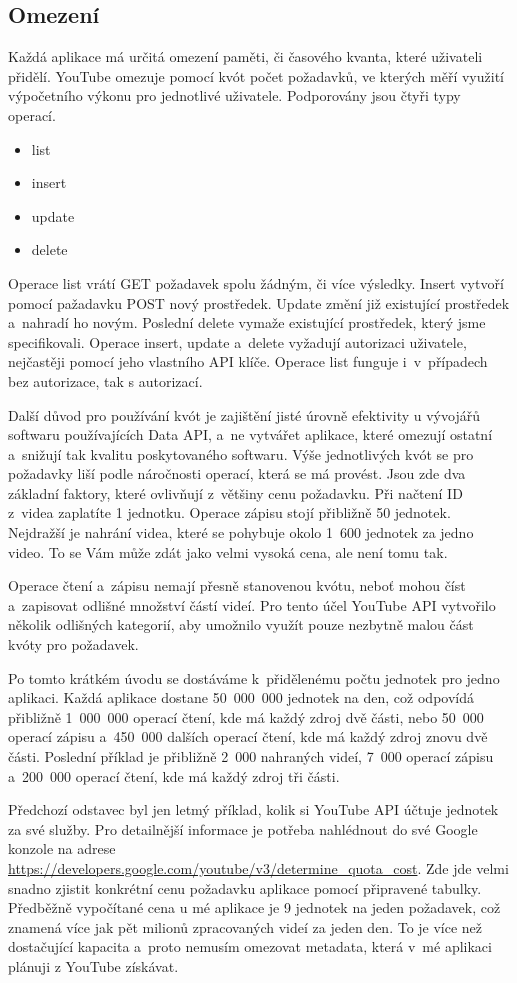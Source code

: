 \subsection{Omezení}
\par Každá aplikace má určitá omezení paměti\cite{quota}\cite{googleconsole}, či časového kvanta, které uživateli přidělí. YouTube omezuje pomocí kvót počet požadavků, ve kterých měří využití výpočetního výkonu pro jednotlivé uživatele. Podporovány jsou čtyři typy operací.
\begin{itemize}
\item {list}
\item {insert}
\item {update}
\item {delete}
\end{itemize}
\par Operace list vrátí GET požadavek spolu žádným, či více výsledky. Insert vytvoří pomocí pažadavku POST nový prostředek. Update změní již existující prostředek a~nahradí ho novým. Poslední delete vymaže existující prostředek, který jsme specifikovali. Operace insert, update a~delete vyžadují autorizaci uživatele, nejčastěji pomocí jeho vlastního API\cite{apistart} klíče. Operace list funguje i~v~případech bez autorizace, tak s autorizací.
\par Další důvod pro používání kvót je zajištění jisté úrovně efektivity u vývojářů softwaru používajících Data API, a~ne vytvářet aplikace, které omezují ostatní a~snižují tak kvalitu poskytovaného softwaru. Výše jednotlivých kvót se pro požadavky liší podle náročnosti operací, která se má provést. Jsou zde dva základní faktory, které ovlivňují z~většiny cenu požadavku. Při načtení ID z~videa zaplatíte 1 jednotku. Operace zápisu stojí přibližně 50 jednotek. Nejdražší je nahrání videa, které se pohybuje okolo 1~600 jednotek za jedno video. To se Vám může zdát jako velmi vysoká cena, ale není tomu tak. 
\par Operace čtení a~zápisu nemají přesně stanovenou kvótu, neboť mohou číst a~zapisovat odlišné množství částí videí. Pro tento účel YouTube API vytvořilo několik odlišných kategorií, aby umožnilo využít pouze nezbytně malou část kvóty pro požadavek. 
\par Po tomto krátkém úvodu se dostáváme k~přidělenému počtu jednotek pro jedno aplikaci. Každá aplikace dostane 50~000~000 jednotek na den, což odpovídá přibližně 1~000~000 operací čtení, kde má každý zdroj dvě části, nebo 50~000 operací zápisu a~450~000 dalších operací čtení, kde má každý zdroj znovu dvě části. Poslední příklad je přibližně 2~000 nahraných videí, 7~000 operací zápisu a~200~000 operací čtení, kde má každý zdroj tři části.
\par Předchozí odstavec byl jen letmý příklad, kolik si YouTube API účtuje jednotek za své služby. Pro detailnější informace je potřeba nahlédnout do své Google konzole na adrese \url{https://developers.google.com/youtube/v3/determine_quota_cost}\cite{quota}. Zde jde velmi snadno zjistit konkrétní cenu požadavku aplikace pomocí připravené tabulky. Předběžně vypočítané cena u mé aplikace je 9 jednotek na jeden požadavek, což znamená více jak pět milionů zpracovaných videí za jeden den. To je více než dostačující kapacita a~proto nemusím omezovat metadata, která v~mé aplikaci plánuji z YouTube získávat. 